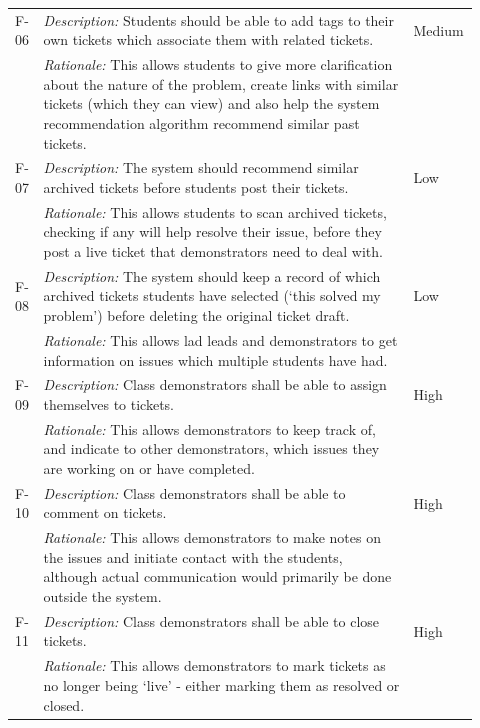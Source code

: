 \begin{table}[H]
\begin{tabular}{|p{0.05\linewidth} | p{0.78\linewidth} |p{0.09\linewidth}|}
  
 \hline\hline
 F-06 & \textit{Description:} Students should be able to add tags to their own tickets which associate them with related tickets. & Medium\\
  \cline{2-2}
  & \textit{Rationale:} This allows students to give more clarification about the nature of the problem, create links with similar tickets (which they can view) and also help the system recommendation algorithm recommend similar past tickets. & \\

  
    \hline\hline
 F-07 & \textit{Description:} The system should recommend similar archived tickets before students post their tickets. & Low\\
  \cline{2-2}
  & \textit{Rationale:} This allows students to scan archived tickets, checking if any will help resolve their issue, before they post a live ticket that demonstrators need to deal with. & \\
  
      \hline\hline
 F-08 & \textit{Description:} The system should keep a record of which archived tickets students have selected (`this solved my problem') before deleting the original ticket draft. & Low\\
  \cline{2-2}
  & \textit{Rationale:} This allows lad leads and demonstrators to get information on issues which multiple students have had. & \\
  
   \hline\hline
 F-09 & \textit{Description:} Class demonstrators shall be able to assign themselves to tickets. & High\\
  \cline{2-2}
  & \textit{Rationale:} This allows demonstrators to keep track of, and indicate to other demonstrators, which issues they are working on or have completed. & \\

  
  \hline\hline
 F-10 & \textit{Description:} Class demonstrators shall be able to comment on tickets. & High\\
  \cline{2-2}
  & \textit{Rationale:} This allows demonstrators to make notes on the issues and initiate contact with the students, although actual communication would primarily be done outside the system. & \\

    \hline\hline
 F-11 & \textit{Description:} Class demonstrators shall be able to close tickets. & High\\
  \cline{2-2}
  & \textit{Rationale:} This allows demonstrators to mark tickets as no longer being `live' - either marking them as resolved or closed. & \\


\end{tabular}
\end{table}
